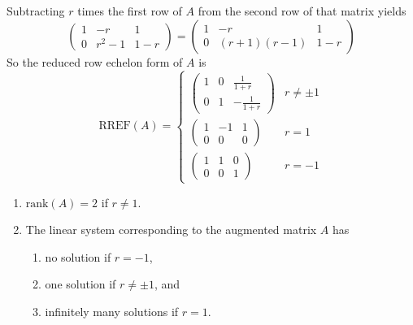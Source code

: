 \documentclass{article}
\begin{document}
\begin{exercise}
\begin{solution}
\soln Subtracting $r$ times the first row of $A$ from the second row of that matrix yields
\[
\left(\begin{array}{cc|c}  
 1 & -r & 1\\  
 0 & r^2-1 & 1-r 
\end{array}\right)=\left(\begin{array}{cc|c}  
 1 & -r & 1\\  
 0 & (r+1)(r-1) & 1-r 
\end{array}\right)
\]
So the reduced row echelon form of $A$ is
\[
\text{RREF}(A)=\begin{cases}
\left(\begin{array}{cc|c}  
 1 & 0 & \frac{1}{1+r}\\  
 0 & 1 & -\frac{1}{1+r}
\end{array}\right) & r\neq \pm 1\\
\left(\begin{array}{cc|c}  
 1 & -1 & 1\\  
 0 & 0 & 0 
\end{array}\right) & r=1\\
\left(\begin{array}{cc|c}  
 1 & 1 & 0\\  
 0 & 0 & 1 
\end{array}\right) & r=-1
\end{cases}
\]
\begin{enumerate}
\item $\text{rank}(A)=2$ if $r\neq 1$.
\item The linear system corresponding to the augmented matrix $A$ has 
\begin{enumerate}
\item no solution if $r=-1$, 
\item one solution if $r\neq \pm 1$, and  
\item infinitely many solutions if $r=1$.
\end{enumerate}
\end{enumerate}
\end{solution}
\end{exercise}





\problemlabel
\end{document}
